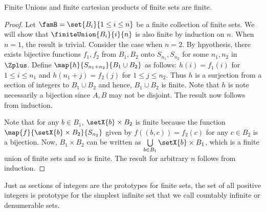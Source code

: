 \begin{Theorem}
    Finite Unions and finite cartesian products of finite sets are finite.
\end{Theorem}
\begin{proof}
    Let $\famB = \set{B_i}{1\leq i \leq n}$ be a finite collection of finite sets. We will show that
    $\finiteUnion{B_i}{i}{n}$ is also finite by induction on $n$.
    When $n = 1$, the result is trivial. Consider the case when $n = 2$. By hpyothesis, there exists bijective
    functions $f_1,f_2$ from $B_1,B_2$ onto $S_{n_1},S_{n_2}$ for some $n_1,n_2$ in $\Zplus$. Define
    $\map{h}{S_{n_1+n_2}}{B_1\cup B_2}$ as follows:
    $h(i) = f_1(i)$ for $1\leq i \leq n_1$ and $h(n_1+j) = f_2(j)$ for $1 \leq j \leq n_2$. Thus $h$ is a
    surjection from a section of integers to $B_1\cup B_2$ and hence, $B_1\cup B_2$ is finite. Note that $h$
    is note necessarily a bijection since $A,B$ may not be disjoint. The result now follows from induction.

    Note that for any $b \in B_1$, $\setX{b}\times B_2$ is finite because the function
    $\map{f}{\setX{b}\times B_2}{S_{n_2}}$ given by $f((b,c)) = f_2(c)$ for any $c \in B_2$ 
    is a bijection. Now, $B_1\times B_2$
    can be written as $\bigcup\limits_{b\in B_1}\setX{b}\times B_1$, which is a finite union of finite sets and
    so is finite. The result for arbitrary $n$ follows from induction.
\end{proof}
Just as sections of integers are the prototypes for finite sets, the set of all positive integers is
prototype for the simplest infinite set that we call countably infinite or denumerable sets.

